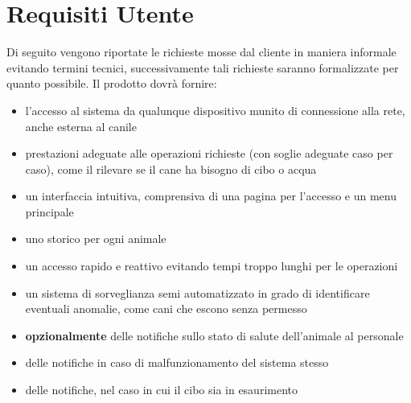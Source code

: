 	\section{Requisiti Utente}
	Di seguito vengono riportate le richieste mosse dal cliente in maniera informale evitando termini tecnici, successivamente tali richieste saranno formalizzate per quanto possibile.
	Il prodotto dovrà fornire: 
		\begin{itemize}
            \item l'accesso al sistema da qualunque dispositivo munito di connessione alla rete, anche esterna al canile
            \item prestazioni adeguate alle operazioni richieste (con soglie adeguate caso per caso), come il rilevare se il cane ha bisogno di cibo o acqua 
            \item un interfaccia intuitiva, comprensiva di una pagina per l'accesso e un menu principale
            \item uno storico per ogni animale
            \item un accesso rapido e reattivo evitando tempi troppo lunghi per le operazioni
            \item un sistema di sorveglianza semi automatizzato in grado di identificare eventuali anomalie, come cani che escono senza permesso
            \item \textbf{opzionalmente} delle notifiche sullo stato di salute dell'animale al personale
            \item delle notifiche in caso di malfunzionamento del sistema stesso
            \item delle notifiche, nel caso in cui il cibo sia in esaurimento 
        \end{itemize}
